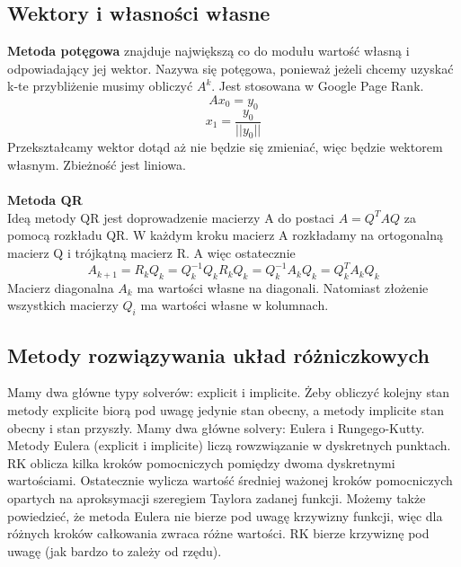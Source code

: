 \documentclass[12pt]{article}
\begin{document}
\subsection{Wektory i własności własne}
\textbf{Metoda potęgowa} znajduje największą co do modułu wartość własną i odpowiadający jej wektor. Nazywa się potęgowa, ponieważ jeżeli chcemy uzyskać k-te przybliżenie musimy obliczyć $A^{k}$. Jest stosowana w Google Page Rank.
$$Ax_{0} = y_{0}$$ $$x_{1} = \frac{y_{0}}{||y_{0}||}$$ Przekształcamy wektor dotąd aż nie będzie się zmieniać, więc będzie wektorem własnym. Zbieżność jest liniowa.\\
~\\
\textbf{Metoda QR}\\
Ideą metody QR jest doprowadzenie macierzy A do postaci $A = Q^{T}AQ$ za pomocą rozkładu QR. W każdym kroku macierz A rozkładamy na ortogonalną macierz Q i trójkątną macierz R. A więc ostatecznie $$A_{k+1} = R_{k}Q_{k} = Q^{-1}_{k}Q_{k}R_{k}Q_{k} = Q^{-1}_{k}A_{k}Q_{k} = Q^{T}_{k}A_{k}Q_{k}$$ Macierz diagonalna $A_{k}$ ma wartości własne na diagonali. Natomiast złożenie wszystkich macierzy $Q_{i}$ ma wartości własne w kolumnach.

\subsection{Metody rozwiązywania układ różniczkowych}
Mamy dwa główne typy solverów: explicit i implicite. Żeby obliczyć kolejny stan metody explicite biorą pod uwagę jedynie stan obecny, a metody implicite stan obecny i stan przyszły. Mamy dwa główne solvery: Eulera i Rungego-Kutty. Metody Eulera (explicit i implicite) liczą rowzwiązanie w dyskretnych punktach. RK oblicza kilka kroków pomocniczych pomiędzy dwoma dyskretnymi wartościami. Ostatecznie wylicza wartość średniej ważonej kroków pomocniczych opartych na aproksymacji szeregiem Taylora zadanej funkcji. Możemy także powiedzieć, że metoda Eulera nie bierze pod uwagę krzywizny funkcji, więc dla różnych kroków całkowania zwraca różne wartości. RK bierze krzywiznę pod uwagę (jak bardzo to zależy od rzędu).
\end{document}
